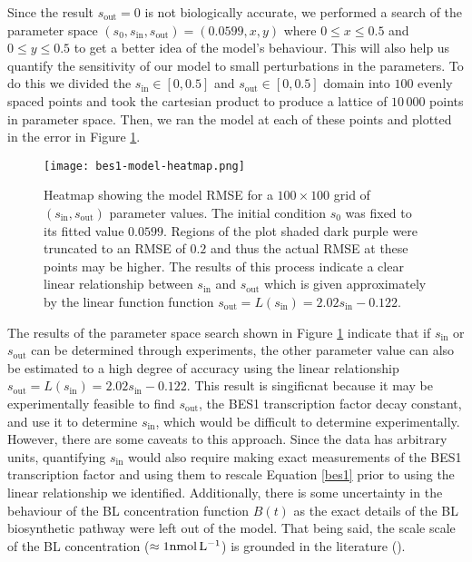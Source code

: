 Since the result $s_{\text{out}} = 0$ is not biologically accurate, we performed a search of the parameter space $(s_{0}, s_{\text{in}}, s_{\text{out}}) = (0.0599, x, y)$ where $0 \leq x \leq 0.5$ and $0 \leq y \leq 0.5$ to get a better idea of the model's behaviour. This will also help us quantify the sensitivity of our model to small perturbations in the parameters. To do this we divided the $s_{\text{in}} \in [0, 0.5]$ and $s_{\text{out}} \in [0, 0.5]$ domain into $100$ evenly spaced points and took the cartesian product to produce a lattice of $10\,000$ points in parameter space. Then, we ran the model at each of these points and plotted in the error in Figure \ref{fig:bes1-model-heatmap}.

\begin{figure}[!hbt]
    \centering
    \texttt{[image: bes1-model-heatmap.png]}
    \caption{Heatmap showing the model RMSE for a $100 \times 100$ grid of $(s_{\text{in}}, s_{\text{out}})$ parameter values. The initial condition $s_{0}$ was fixed to its fitted value $0.0599$. Regions of the plot shaded dark purple were truncated to an RMSE of $0.2$ and thus the actual RMSE at these points may be higher. The results of this process indicate a clear linear relationship between $s_{\text{in}}$ and $s_{\text{out}}$ which is given approximately by the linear function function $s_{\text{out}} = L(s_{\text{in}}) = 2.02s_{\text{in}} - 0.122$. }
    \label{fig:bes1-model-heatmap}
\end{figure}

\medskip


The results of the parameter space search shown in Figure \ref{fig:bes1-model-heatmap} indicate that if $s_{\text{in}}$ or $s_{\text{out}}$ can be determined through experiments, the other parameter value can also be estimated to a high degree of accuracy using the linear relationship $s_{\text{out}} = L(s_{\text{in}}) = 2.02s_{\text{in}} - 0.122$. This result is singificnat because it may be experimentally feasible to find $s_{\text{out}}$, the BES1 transcription factor decay constant, and use it to determine $s_{\text{in}}$, which would be difficult to determine experimentally. However, there are some caveats to this approach. Since the data has arbitrary units, quantifying $s_{\text{in}}$ would also require making exact measurements of the BES1 transcription factor and using them to rescale Equation \eqref{bes1} prior to using the linear relationship we identified. Additionally, there is some uncertainty in the behaviour of the BL concentration function $B(t)$ as the exact details of the BL biosynthetic pathway were left out of the model. That being said, the scale scale of the BL concentration ($\approx 1\nm$) is grounded in the literature (\cite{vanesse2012}). 

